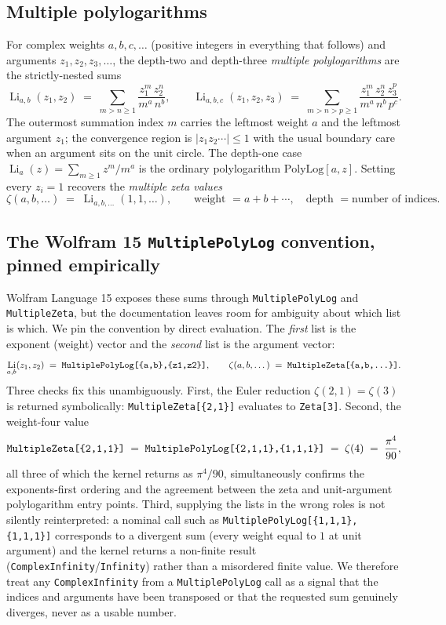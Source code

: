 \documentclass[11pt]{article}
\DeclareMathOperator{\Li}{Li}
\theoremstyle{plain}
\theoremstyle{remark}
\begin{document}
\subsection{Multiple polylogarithms}

For complex weights $a,b,c,\dots$ (positive integers in everything that follows) and arguments $z_1,z_2,z_3,\dots$, the depth-two and depth-three \emph{multiple polylogarithms} are the strictly-nested sums
\[
  \Li_{a,b}(z_1,z_2)
    \;=\; \sum_{m>n\ge 1} \frac{z_1^{m}\,z_2^{n}}{m^{a}\,n^{b}},
  \qquad
  \Li_{a,b,c}(z_1,z_2,z_3)
    \;=\; \sum_{m>n>p\ge 1} \frac{z_1^{m}\,z_2^{n}\,z_3^{p}}{m^{a}\,n^{b}\,p^{c}} .
\]
The outermost summation index $m$ carries the leftmost weight $a$ and the leftmost argument $z_1$; the convergence region is $|z_1z_2\cdots| \le 1$ with the usual boundary care when an argument sits on the unit circle. The depth-one case $\Li_{a}(z)=\sum_{m\ge 1} z^{m}/m^{a}$ is the ordinary polylogarithm $\mathrm{PolyLog}[a,z]$. Setting every $z_i=1$ recovers the \emph{multiple zeta values}
\[
  \zeta(a,b,\dots) \;=\; \Li_{a,b,\dots}(1,1,\dots),
  \qquad
  \text{weight } = a+b+\cdots,\quad \text{depth } = \text{number of indices.}
\]

\subsection{The Wolfram 15 \texttt{MultiplePolyLog} convention, pinned empirically}

Wolfram Language 15 exposes these sums through \texttt{MultiplePolyLog} and \texttt{MultipleZeta}, but the documentation leaves room for ambiguity about which list is which. We pin the convention by direct evaluation. The \emph{first} list is the exponent (weight) vector and the \emph{second} list is the argument vector:
\[
  \Li_{a,b}(z_1,z_2)
    \;=\; \texttt{MultiplePolyLog[\{a,b\},\allowbreak\{z1,z2\}]},
  \qquad
  \zeta(a,b,\dots) \;=\; \texttt{MultipleZeta[\{a,b,\dots\}]}.
\]
Three checks fix this unambiguously. First, the Euler reduction $\zeta(2,1)=\zeta(3)$ is returned symbolically: \texttt{MultipleZeta[\{2,1\}]} evaluates to \texttt{Zeta[3]}. Second, the weight-four value
\[
  \texttt{MultipleZeta[\{2,1,1\}]}
   \;=\; \texttt{MultiplePolyLog[\{2,1,1\},\allowbreak\{1,1,1\}]}
   \;=\; \zeta(4) \;=\; \frac{\pi^{4}}{90},
\]
all three of which the kernel returns as $\pi^{4}/90$, simultaneously confirms the exponents-first ordering and the agreement between the zeta and unit-argument polylogarithm entry points. Third, supplying the lists in the wrong roles is not silently reinterpreted: a nominal call such as \texttt{MultiplePolyLog[\{1,1,1\},\allowbreak\{1,1,1\}]} corresponds to a divergent sum (every weight equal to $1$ at unit argument) and the kernel returns a non-finite result (\texttt{ComplexInfinity}/\texttt{Infinity}) rather than a misordered finite value. We therefore treat any \texttt{ComplexInfinity} from a \texttt{MultiplePolyLog} call as a signal that the indices and arguments have been transposed or that the requested sum genuinely diverges, never as a usable number.
\end{document}
